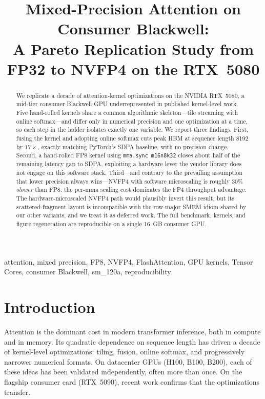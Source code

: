 \documentclass[conference]{IEEEtran}
\title{Mixed-Precision Attention on Consumer Blackwell:\\
A Pareto Replication Study from FP32 to NVFP4 on the RTX~5080}
\author{
  \IEEEauthorblockN{Anonymous Author(s)}
  \IEEEauthorblockA{Affiliation withheld for review}
}
\begin{document}
\maketitle

\begin{abstract}
We replicate a decade of attention-kernel optimizations on the NVIDIA
RTX~5080, a mid-tier consumer Blackwell GPU underrepresented in
published kernel-level work. Five hand-rolled kernels share a common
algorithmic skeleton---tile streaming with online softmax---and differ
only in numerical precision and one optimization at a time, so each
step in the ladder isolates exactly one variable. We report three
findings. First, fusing the kernel and adopting online softmax cuts
peak HBM at sequence length 8192 by $17\times$, exactly matching
PyTorch's SDPA baseline, with no precision change. Second, a hand-rolled
FP8 kernel using \texttt{mma.sync m16n8k32} closes about half of the
remaining latency gap to SDPA, exploiting a hardware lever the vendor
library does not engage on this software stack. Third---and contrary to
the prevailing assumption that lower precision always wins---NVFP4 with
software microscaling is roughly $30\%$ \emph{slower} than FP8: the
per-mma scaling cost dominates the FP4 throughput advantage. The
hardware-microscaled NVFP4 path would plausibly invert this result, but
its scattered-fragment layout is incompatible with the row-major SMEM
idiom shared by our other variants, and we treat it as deferred work.
The full benchmark, kernels, and figure regeneration are reproducible
on a single 16~GB consumer GPU.
\end{abstract}

\begin{IEEEkeywords}
attention, mixed precision, FP8, NVFP4, FlashAttention, GPU kernels,
Tensor Cores, consumer Blackwell, sm\_120a, reproducibility
\end{IEEEkeywords}

\section{Introduction}
\label{sec:intro}

Attention is the dominant cost in modern transformer inference, both in
compute and in memory. Its quadratic dependence on sequence length has
driven a decade of kernel-level optimizations: tiling, fusion, online
softmax, and progressively narrower numerical formats. On datacenter
GPUs (H100, B100, B200), each of these ideas has been validated
independently, often more than once. On the flagship consumer card
(RTX~5090), recent work confirms that the optimizations transfer.
\end{document}
